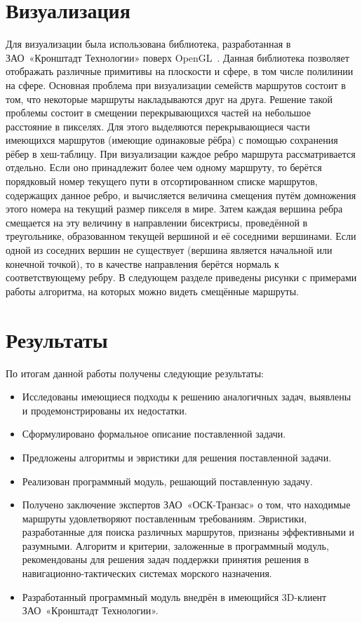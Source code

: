 \FloatBarrier

\section{Визуализация}

Для визуализации была использована библиотека, разработанная в
ЗАО~«Кронштадт Технологии» поверх OpenGL~\cite{opengl}. Данная
библиотека позволяет отображать различные примитивы на плоскости и
сфере, в том числе полилинии на сфере. Основная проблема при
визуализации семейств маршрутов состоит в том, что некоторые маршруты
накладываются друг на друга. Решение такой проблемы состоит в смещении
перекрывающихся частей на небольшое расстояние в пикселях. Для этого
выделяются перекрывающиеся части имеющихся маршрутов (имеющие
одинаковые рёбра) с помощью сохранения рёбер в хеш-таблицу. При
визуализации каждое ребро маршрута рассматривается отдельно. Если оно
принадлежит более чем одному маршруту, то берётся порядковый номер
текущего пути в отсортированном списке маршрутов, содержащих данное
ребро, и вычисляется величина смещения путём домножения этого номера
на текущий размер пикселя в мире. Затем каждая вершина ребра смещается
на эту величину в направлении бисектрисы, проведённой в треугольнике,
образованном текущей вершиной и её соседними вершинами. Если одной из
соседних вершин не существует (вершина является начальной или конечной
точкой), то в качестве направления берётся нормаль к соответствующему
ребру. В следующем разделе приведены рисунки с примерами работы
алгоритма, на которых можно видеть смещённые маршруты.

\FloatBarrier

\section{Результаты}

По итогам данной работы получены следующие результаты:
\begin{itemize}
    \item Исследованы имеющиеся подходы к решению аналогичных задач,
      выявлены и продемонстрированы их недостатки.
    \item Сформулировано формальное описание поставленной задачи.
    \item Предложены алгоритмы и эвристики для решения поставленной
      задачи.
    \item Реализован программный модуль, решающий поставленную задачу.
    \item Получено заключение экспертов ЗАО~«ОСК-Транзас» о том, что
      находимые маршруты удовлетворяют поставленным требованиям.
      Эвристики, разработанные для поиска различных маршрутов,
      признаны эффективными и разумными. Алгоритм и критерии,
      заложенные в программный модуль, рекомендованы для решения задач
      поддержки принятия решения в навигационно-тактических системах
      морского назначения.
    \item Разработанный программный модуль внедрён в имеющийся
      3D-клиент ЗАО~«Кронштадт Технологии».
\end{itemize}

